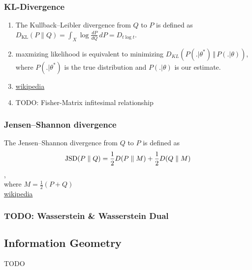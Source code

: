 \subsubsection{KL-Divergence}
\begin{enumerate}
	\item The Kullback–Leibler divergence from $Q$ to $P$ is defined as\\
	$D_{\mathrm {KL} }(P\|Q)=\int _{X}\log {\frac {dP}{dQ}}\,dP=D_{t\log t}$.
	\item maxmizing likelihood is equivalent to minimizing $D_{KL}(P(. \vert \theta^{\ast}) \, \Vert \, P(. \vert \theta))$, where $P(. \vert \theta^{\ast})$ is the true distribution and $P(. \vert \theta)$ is our estimate.
	\item \href{https://en.wikipedia.org/wiki/Kullback–Leibler_divergence}{wikipedia}
	\item TODO: Fisher-Matrix infitesimal relationship
\end{enumerate}

\subsubsection{Jensen–Shannon divergence}
The Jensen–Shannon divergence from $Q$ to $P$ is defined as
\begin{align*}
	{{\rm {JSD}}}(P\parallel Q)={\frac  {1}{2}}D(P\parallel M)+{\frac  {1}{2}}D(Q\parallel M)
\end{align*},\\
 where $M={\frac  {1}{2}}(P+Q)$\\
\href{https://en.wikipedia.org/wiki/Jensen–Shannon_divergence}{wikipedia}

\subsubsection{TODO: Wasserstein \& Wasserstein Dual}

\subsection{Information Geometry}
TODO
